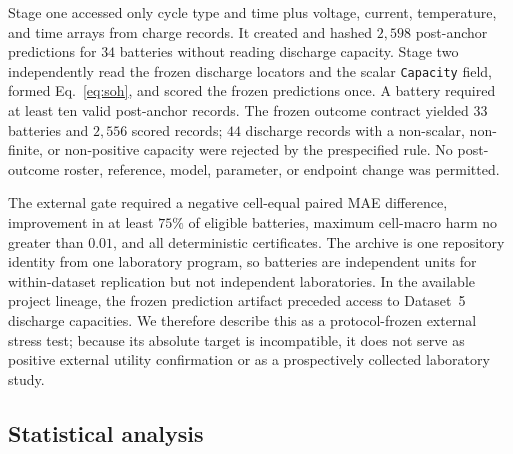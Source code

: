 \documentclass[11pt]{article}
\begin{document}
Stage one accessed only cycle type and time plus voltage, current, temperature, and time arrays from charge records. It created and hashed $2{,}598$ post-anchor predictions for $34$ batteries without reading discharge capacity. Stage two independently read the frozen discharge locators and the scalar \texttt{Capacity} field, formed Eq.~\eqref{eq:soh}, and scored the frozen predictions once. A battery required at least ten valid post-anchor records. The frozen outcome contract yielded $33$ batteries and $2{,}556$ scored records; $44$ discharge records with a non-scalar, non-finite, or non-positive capacity were rejected by the prespecified rule. No post-outcome roster, reference, model, parameter, or endpoint change was permitted.

The external gate required a negative cell-equal paired MAE difference, improvement in at least $75\%$ of eligible batteries, maximum cell-macro harm no greater than $0.01$, and all deterministic certificates. The archive is one repository identity from one laboratory program, so batteries are independent units for within-dataset replication but not independent laboratories. In the available project lineage, the frozen prediction artifact preceded access to Dataset~5 discharge capacities. We therefore describe this as a protocol-frozen external stress test; because its absolute target is incompatible, it does not serve as positive external utility confirmation or as a prospectively collected laboratory study.

\subsection{Statistical analysis}
\end{document}

